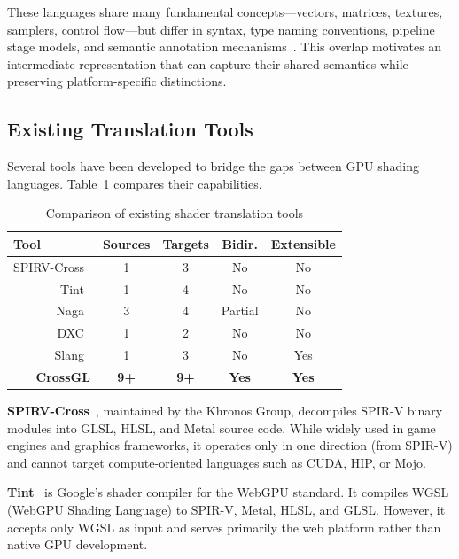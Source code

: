 \documentclass{svproc}
\begin{document}
These languages share many fundamental concepts---vectors, matrices, textures, samplers, control flow---but differ in syntax, type naming conventions, pipeline stage models, and semantic annotation mechanisms~\cite{owens2008gpu}. This overlap motivates an intermediate representation that can capture their shared semantics while preserving platform-specific distinctions.

\subsection{Existing Translation Tools}

Several tools have been developed to bridge the gaps between GPU shading languages. Table~\ref{tab:tools} compares their capabilities.

\begin{table}
\caption{Comparison of existing shader translation tools}
\label{tab:tools}
\begin{center}
\begin{tabular}{r@{\quad}cccc}
\hline
\multicolumn{1}{l}{\rule{0pt}{12pt}\textbf{Tool}} & \textbf{Sources} & \textbf{Targets} & \textbf{Bidir.} & \textbf{Extensible} \\[2pt]
\hline\rule{0pt}{12pt}
SPIRV-Cross~\cite{khronos2023spirvcross} & 1 & 3 & No & No \\
Tint~\cite{google2023tint} & 1 & 4 & No & No \\
Naga~\cite{mozilla2023naga} & 3 & 4 & Partial & No \\
DXC~\cite{microsoft2023dxc} & 1 & 2 & No & No \\
Slang~\cite{he2018slang} & 1 & 3 & No & Yes \\
\textbf{CrossGL} & \textbf{9+} & \textbf{9+} & \textbf{Yes} & \textbf{Yes} \\[2pt]
\hline
\end{tabular}
\end{center}
\end{table}

\textbf{SPIRV-Cross}~\cite{khronos2023spirvcross}, maintained by the Khronos Group, decompiles SPIR-V binary modules into GLSL, HLSL, and Metal source code. While widely used in game engines and graphics frameworks, it operates only in one direction (from SPIR-V) and cannot target compute-oriented languages such as CUDA, HIP, or Mojo.

\textbf{Tint}~\cite{google2023tint} is Google's shader compiler for the WebGPU standard. It compiles WGSL (WebGPU Shading Language) to SPIR-V, Metal, HLSL, and GLSL. However, it accepts only WGSL as input and serves primarily the web platform rather than native GPU development.
\end{document}
